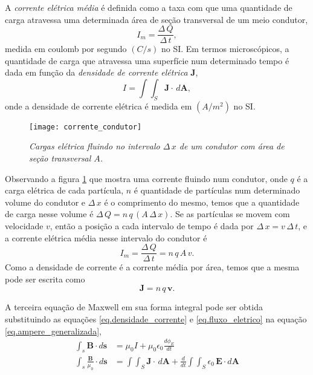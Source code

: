 A \textit{corrente elétrica média} é definida como a taxa com que uma quantidade de carga atravessa uma determinada área de seção transversal de um meio condutor,
\begin{equation*}
I_m=\frac{\Delta\,Q}{\Delta\,t},
\end{equation*}
medida em coulomb por segundo $(C/s)$ no SI. Em termos microscópicos, a quantidade de carga que atravessa uma superfície num determinado tempo é dada em função da \textit{densidade de corrente elétrica} $\mathbf{J}$,
\begin{equation}\label{eq.densidade_corrente}
I=\int\int_S\mathbf{J}\cdot\,d\mathbf{A},
\end{equation}
onde a densidade de corrente elétrica é medida em $(A/m^2)$ no SI. 
\begin{figure}
\centering
\texttt{[image: corrente\_condutor]}
\caption{\textit{Cargas elétrica fluindo no intervalo $\Delta\,x$ de um condutor com área de seção transversal $A$.}}
\label{fig.corre_condu}
\end{figure}
Observando a figura \ref{fig.corre_condu} que mostra uma corrente fluindo num condutor, onde $q$ é a carga elétrica de cada partícula, $n$ é quantidade de partículas num determinado volume do condutor e $\Delta\,x$ é o comprimento do mesmo, temos que a quantidade de carga nesse volume é $\Delta\,Q=n\,q\,(A\,\Delta\,x)$. Se as partículas se movem com velocidade $v$, então a posição a cada intervalo de tempo é dada por $\Delta\,x=v\,\Delta\,t$, e a corrente elétrica média nesse intervalo do condutor é
\begin{equation*}
I_m=\frac{\Delta\,Q}{\Delta\,t}=n\,q\,A\,v.
\end{equation*}
Como a densidade de corrente é a corrente média por área, temos que a mesma pode ser escrita como 
\begin{equation*}
\mathbf{J}=n\,q\,\mathbf{v}.
\end{equation*}

A terceira equação de Maxwell em sua forma integral pode ser obtida substituindo as equações \ref{eq.densidade_corrente} e \ref{eq.fluxo_eletrico} na equação \ref{eq.ampere_generalizada},
\begin{align*}
\int_s\mathbf{B}\cdot d\mathbf{s}&=\mu_0I+\mu_0\epsilon_0\frac{d\phi_E}{dt}\\
\int_s\frac{\mathbf{B}}{\mu_0}\cdot d\mathbf{s}&=\int\int_S\mathbf{J}\cdot\,d\mathbf{A}+\frac{d}{dt}\int\int_S\epsilon_0\,\textbf{E}\cdot\textit{d}\textbf{A}
\end{align*}


